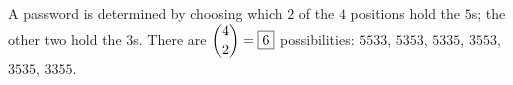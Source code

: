 A password is determined by choosing which $2$ of the $4$ positions hold the $5$s; the other two hold the $3$s. There are $\dbinom42=\boxed{6}$ possibilities: $5533$, $5353$, $5335$, $3553$, $3535$, $3355$.
